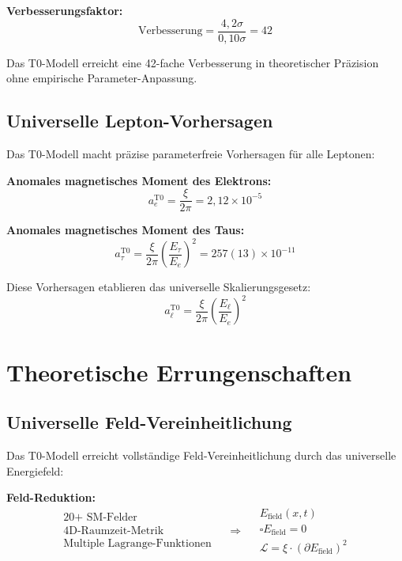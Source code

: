\documentclass[12pt,a4paper]{report}
\begin{document}
	\textbf{Verbesserungsfaktor:}
	\begin{equation}
		\text{Verbesserung} = \frac{4,2\sigma}{0,10\sigma} = 42
	\end{equation}
	
	Das T0-Modell erreicht eine 42-fache Verbesserung in theoretischer Präzision ohne empirische Parameter-Anpassung.
	
	\subsection{Universelle Lepton-Vorhersagen}
	\label{subsec:universal_lepton_predictions}
	
	Das T0-Modell macht präzise parameterfreie Vorhersagen für alle Leptonen:
	
	\textbf{Anomales magnetisches Moment des Elektrons:}
	\begin{equation}
		a_e^{\text{T0}} = \frac{\xi}{2\pi} = 2,12 \times 10^{-5}
	\end{equation}
	
	\textbf{Anomales magnetisches Moment des Taus:}
	\begin{equation}
		a_\tau^{\text{T0}} = \frac{\xi}{2\pi} \left(\frac{E_\tau}{E_e}\right)^2 = 257(13) \times 10^{-11}
	\end{equation}
	
	Diese Vorhersagen etablieren das universelle Skalierungsgesetz:
	\begin{equation}
		a_\ell^{\text{T0}} = \frac{\xi}{2\pi} \left(\frac{E_\ell}{E_e}\right)^2
	\end{equation}
	
	\section{Theoretische Errungenschaften}
	\label{sec:theoretical_achievements}
	
	\subsection{Universelle Feld-Vereinheitlichung}
	\label{subsec:universal_field_unification}
	
	Das T0-Modell erreicht vollständige Feld-Vereinheitlichung durch das universelle Energiefeld:
	
	\textbf{Feld-Reduktion:}
	\begin{equation}
		\begin{array}{c}
			\text{20+ SM-Felder} \\
			\text{4D-Raumzeit-Metrik} \\
			\text{Multiple Lagrange-Funktionen}
		\end{array} \quad \Rightarrow \quad
		\begin{array}{c}
			E_{\text{field}}(x,t) \\
			\square E_{\text{field}} = 0 \\
			\mathcal{L} = \xi \cdot (\partial E_{\text{field}})^2
		\end{array}
	\end{equation}
	
\end{document}

